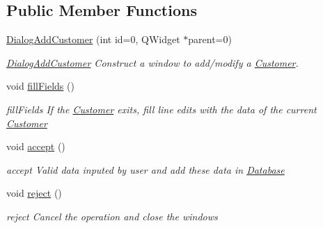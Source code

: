 \subsection*{Public Member Functions}
\begin{DoxyCompactItemize}
\item 
\hyperlink{classDialogAddCustomer_a6123adb32813c5ebe71ce06012c46b9c}{Dialog\+Add\+Customer} (int id=0, Q\+Widget $\ast$parent=0)
\begin{DoxyCompactList}\small\item\em \hyperlink{classDialogAddCustomer}{Dialog\+Add\+Customer} Construct a window to add/modify a \hyperlink{classCustomer}{Customer}. \end{DoxyCompactList}\item 
\hypertarget{classDialogAddCustomer_ae06c708abccad5ce0b8523c94b40eb75}{void \hyperlink{classDialogAddCustomer_ae06c708abccad5ce0b8523c94b40eb75}{fill\+Fields} ()}\label{classDialogAddCustomer_ae06c708abccad5ce0b8523c94b40eb75}

\begin{DoxyCompactList}\small\item\em fill\+Fields If the \hyperlink{classCustomer}{Customer} exits, fill line edits with the data of the current \hyperlink{classCustomer}{Customer} \end{DoxyCompactList}\item 
\hypertarget{classDialogAddCustomer_a1492352d114740bb44178f2415555155}{void \hyperlink{classDialogAddCustomer_a1492352d114740bb44178f2415555155}{accept} ()}\label{classDialogAddCustomer_a1492352d114740bb44178f2415555155}

\begin{DoxyCompactList}\small\item\em accept Valid data inputed by user and add these data in \hyperlink{classDatabase}{Database} \end{DoxyCompactList}\item 
\hypertarget{classDialogAddCustomer_a6affc8db156ee183ffd14a71d06a8534}{void \hyperlink{classDialogAddCustomer_a6affc8db156ee183ffd14a71d06a8534}{reject} ()}\label{classDialogAddCustomer_a6affc8db156ee183ffd14a71d06a8534}

\begin{DoxyCompactList}\small\item\em reject Cancel the operation and close the windows \end{DoxyCompactList}\end{DoxyCompactItemize}


